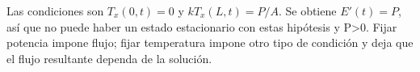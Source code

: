 Las condiciones son \(T_x(0,t)=0\) y \(kT_x(L,t)=P/A\). Se obtiene \(E'(t)=P\), así que no puede haber un estado estacionario con estas hipótesis y P>0. Fijar potencia impone flujo; fijar temperatura impone otro tipo de condición y deja que el flujo resultante dependa de la solución.
